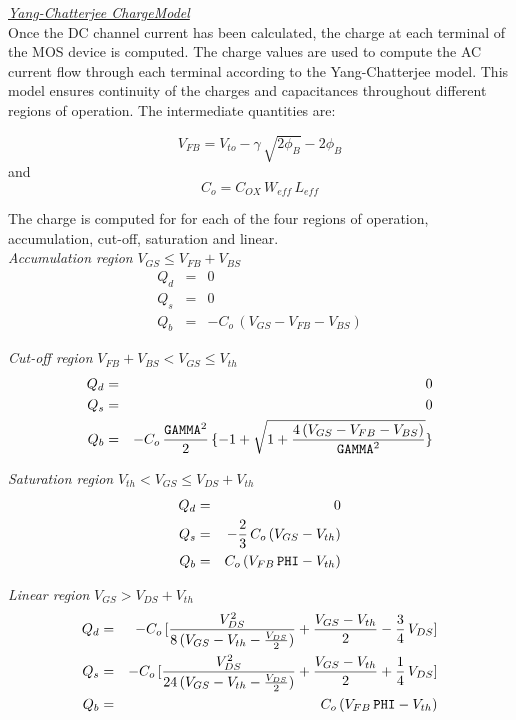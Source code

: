 \documentclass{article}
\newcommand{\PHI}{2\phi_{B}}
\newcommand{\GAMMA}{\gamma}
\begin{document}
\vfill \noindent\underline{\sl \large Yang-Chatterjee
ChargeModel}\\[0.1in]

\noindent Once the DC channel current has been calculated, the
charge at each terminal of the MOS device is computed.  The charge
values are used to compute the AC current flow through each
terminal according to the Yang-Chatterjee model.  This model
ensures continuity of the charges and capacitances throughout
different regions of operation. The intermediate quantities are:

\begin{equation}
V_{FB} = V_{to} - \GAMMA \, \sqrt{\PHI} - \PHI
\end{equation}
and
\begin{equation}
C_o = C_{OX} \, W_{eff} \, L_{eff}
\end{equation}

\noindent The charge is computed for for each of the four regions
of operation, accumulation, cut-off, saturation and linear.\\

\textit{Accumulation region} $V_{GS} \leq V_{FB} + V_{BS}$
\begin{eqnarray}
Q_d & = & 0\\
Q_s & = & 0\\
Q_b & = & -C_o \, (V_{GS} - V_{FB} - V_{BS})
\end{eqnarray}

\textit{Cut-off region} $V_{FB} + V_{BS} < V_{GS} \leq V_{th}$
\begin{eqnarray}
Q_d & = & 0\\
Q_s & = & 0\\
Q_b & = & -C_o \, {\texttt{GAMMA}^2 \over 2} \, \{-1 + \sqrt{1 +
{4 \, (V_{GS} - V_{FB} - V_{BS}) \over \texttt{GAMMA}^2}}\}
\end{eqnarray}

\textit{Saturation region} $V_{th} < V_{GS} \leq V_{DS} + V_{th}$
\begin{eqnarray}
Q_d & = & 0\\
Q_s & = & -{2 \over 3} \, C_o \, (V_{GS} - V_{th}) \\
Q_b & = & C_o \, (V_{FB}\, \texttt{PHI} - V_{th})
\end{eqnarray}

\textit{Linear region} $V_{GS} > V_{DS} + V_{th}$
\begin{eqnarray}
Q_d & = & -C_o \, [{V_{DS}^2 \over 8\,(V_{GS} - V_{th} - {V_{DS} \over 2})} + {V_{GS} - V_{th} \over 2} - {3 \over 4}\,V_{DS}] \\
Q_s & = & -C_o \, [{V_{DS}^2 \over 24\,(V_{GS} - V_{th} - {V_{DS} \over 2})} + {V_{GS} - V_{th} \over 2} + {1 \over 4}\,V_{DS}] \\
Q_b & = & C_o \, (V_{FB}\, \texttt{PHI} - V_{th})
\end{eqnarray}
\end{document}
